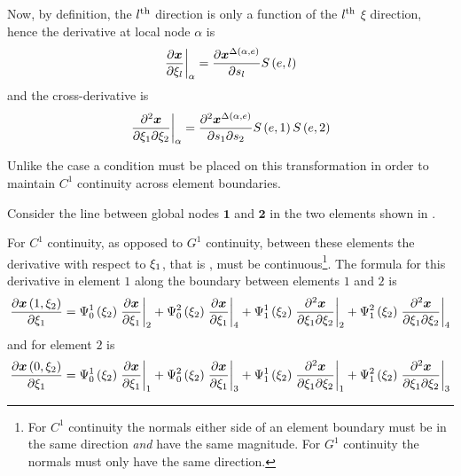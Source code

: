 Now, by definition, the ${l}^{\text{th}}$ \arclen direction is only a function of the
${l}^{\text{th}}$ $\xi$ direction, hence the derivative at local node $\alpha$ is
\begin{equation}
  \evalat{\delby{\vect{x}}{\xi_{l}}}{\alpha}=\delby{\nodept{\vect{x}}{
      \fnof{\Delta}{\alpha,e}}}{s_{l}}\esftwo{e}{l}
  \label{eqn:xitosbich}
\end{equation}
and the cross-derivative is
\begin{equation}
  \evalat{\deltwoby{\vect{x}}{\xione}{\xitwo}}{\alpha}=
  \deltwoby{\nodept{\vect{x}}{\fnof{\Delta}{\alpha,e}}}{s_{1}}{s_{2}}\esftwo{e}{1}
  \esftwo{e}{2}
  \label{eqn:xitosbichcd}
\end{equation}

Unlike the \onedal \cubicherm case a condition must be placed on
this transformation in order to maintain $C^{1}$ continuity across element
boundaries. 

Consider the line between global nodes $\mathbf{1}$ and $\mathbf{2}$ in the
two \bicubicherm elements shown in .

For $C^{1}$ continuity, as opposed to $G^{1}$ continuity, between these
elements the derivative with respect to $\xi_{1}$, that is
, must be continuous\footnote{For
  $C^{1}$ continuity the normals either side of an element boundary must be in
  the same direction \emph{and} have the same magnitude. For $G^{1}$
  continuity the normals must only have the same direction.}. The formula for
this derivative in element $\mathit{1}$ along the boundary between elements
$\mathit{1}$ and $\mathit{2}$ is
\begin{equation}
  \delby{\fnof{\vect{x}}{1,\xitwo}}{\xione}=\chbfn{0}{1}{\xitwo}\evalat{
    \delby{\vect{x}}{\xione}}{2}+\chbfn{0}{2}{\xitwo}\evalat{
    \delby{\vect{x}}{\xione}}{4}+\chbfn{1}{1}{\xitwo}\evalat{
    \deltwoby{\vect{x}}{\xione}{\xitwo}}{2}+\chbfn{1}{2}{\xitwo}\evalat{
    \deltwoby{\vect{x}}{\xione}{\xitwo}}{4}
  \label{eqn:c1contelem1}
\end{equation}
and for element $\mathit{2}$ is
\begin{equation}
  \delby{\fnof{\vect{x}}{0,\xitwo}}{\xione}=\chbfn{0}{1}{\xitwo}\evalat{
    \delby{\vect{x}}{\xione}}{1}+\chbfn{0}{2}{\xitwo}\evalat{
    \delby{\vect{x}}{\xione}}{3}+\chbfn{1}{1}{\xitwo}\evalat{
    \deltwoby{\vect{x}}{\xione}{\xitwo}}{1}+\chbfn{1}{2}{\xitwo}\evalat{
    \deltwoby{\vect{x}}{\xione}{\xitwo}}{3}
  \label{eqn:c1contelem2}
\end{equation}

